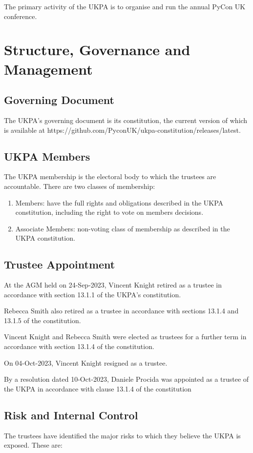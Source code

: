 \documentclass[11pt, final]{article}
\begin{document}
The primary activity of the UKPA is to organise and run the annual PyCon UK conference.

\section{Structure, Governance and Management}

\subsection{Governing Document}
The UKPA's governing document is its constitution, the current version of which is available at https://github.com/PyconUK/ukpa-constitution/releases/latest.

\subsection{UKPA Members}
The UKPA membership is the electoral body to which the trustees are accountable.
There are two classes of membership:

\begin{enumerate}
	\item Members: have the full rights and obligations described in the UKPA constitution, including the right to vote on members decisions.
	\item Associate Members: non-voting class of membership as described in the UKPA constitution.
\end{enumerate}

\subsection{Trustee Appointment}
At the AGM held on 24-Sep-2023, Vincent Knight retired as a trustee in accordance with section 13.1.1 of the UKPA's constitution.

Rebecca Smith also retired as a trustee in accordance with sections 13.1.4 and 13.1.5 of the constitution.

Vincent Knight and Rebecca Smith were elected as trustees for a further term in accordance with section 13.1.4 of the constitution.

On 04-Oct-2023, Vincent Knight resigned as a trustee.

By a resolution dated 10-Oct-2023, Daniele Procida was appointed as a trustee of the UKPA in accordance with clause 13.1.4 of the constitution
\subsection{Risk and Internal Control}
The trustees have identified the major risks to which they believe the UKPA is exposed. These are:
\end{document}
